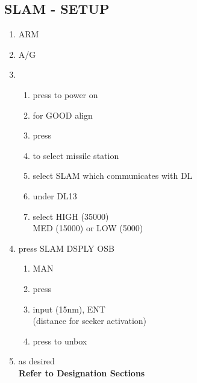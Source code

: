 \documentclass[fontHelvetica, widesubsec]{TechCheck}
\begin{document}
	\subsection{SLAM - SETUP}
	\label{subsec:84setup}
	\begin{enumerate}
		\item {}\dotfill ARM
		\item {}\dotfill A/G
		\item {}
		\begin{enumerate}
			\item {}\dotfill press to power on
			\item {}\dotfill for GOOD align
			\item {}\dotfill press
			\item {}\dotfill to select missile station
			\item {}\dotfill select SLAM  which communicates with DL
			\item {}\dotfill under DL13
			\item {}\dotfill select HIGH (35000) \\
			\hfill MED (15000) or LOW (5000)
		\end{enumerate}
		\item {}\dotfill press SLAM DSPLY OSB
		\begin{enumerate}
			\item {}\dotfill MAN
			\item {}\dotfill press
			\item {}\dotfill input (15nm), ENT \\
			\hfill (distance for seeker activation)
			\item {}\dotfill press to unbox
		\end{enumerate}
		\item {}\dotfill as desired \\
		\hfill \textbf{Refer to Designation Sections}
	\end{enumerate}
\end{document}
